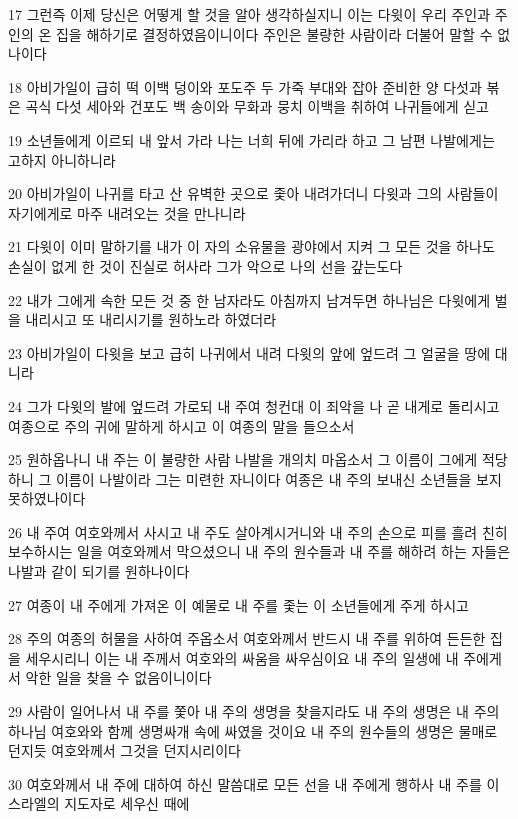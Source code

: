 \par 17 그런즉 이제 당신은 어떻게 할 것을 알아 생각하실지니 이는 다윗이 우리 주인과 주인의 온 집을 해하기로 결정하였음이니이다 주인은 불량한 사람이라 더불어 말할 수 없나이다
\par 18 아비가일이 급히 떡 이백 덩이와 포도주 두 가죽 부대와 잡아 준비한 양 다섯과 볶은 곡식 다섯 세아와 건포도 백 송이와 무화과 뭉치 이백을 취하여 나귀들에게 싣고
\par 19 소년들에게 이르되 내 앞서 가라 나는 너희 뒤에 가리라 하고 그 남편 나발에게는 고하지 아니하니라
\par 20 아비가일이 나귀를 타고 산 유벽한 곳으로 좇아 내려가더니 다윗과 그의 사람들이 자기에게로 마주 내려오는 것을 만나니라
\par 21 다윗이 이미 말하기를 내가 이 자의 소유물을 광야에서 지켜 그 모든 것을 하나도 손실이 없게 한 것이 진실로 허사라 그가 악으로 나의 선을 갚는도다
\par 22 내가 그에게 속한 모든 것 중 한 남자라도 아침까지 남겨두면 하나님은 다윗에게 벌을 내리시고 또 내리시기를 원하노라 하였더라
\par 23 아비가일이 다윗을 보고 급히 나귀에서 내려 다윗의 앞에 엎드려 그 얼굴을 땅에 대니라
\par 24 그가 다윗의 발에 엎드려 가로되 내 주여 청컨대 이 죄악을 나 곧 내게로 돌리시고 여종으로 주의 귀에 말하게 하시고 이 여종의 말을 들으소서
\par 25 원하옵나니 내 주는 이 불량한 사람 나발을 개의치 마옵소서 그 이름이 그에게 적당하니 그 이름이 나발이라 그는 미련한 자니이다 여종은 내 주의 보내신 소년들을 보지 못하였나이다
\par 26 내 주여 여호와께서 사시고 내 주도 살아계시거니와 내 주의 손으로 피를 흘려 친히 보수하시는 일을 여호와께서 막으셨으니 내 주의 원수들과 내 주를 해하려 하는 자들은 나발과 같이 되기를 원하나이다
\par 27 여종이 내 주에게 가져온 이 예물로 내 주를 좇는 이 소년들에게 주게 하시고
\par 28 주의 여종의 허물을 사하여 주옵소서 여호와께서 반드시 내 주를 위하여 든든한 집을 세우시리니 이는 내 주께서 여호와의 싸움을 싸우심이요 내 주의 일생에 내 주에게서 악한 일을 찾을 수 없음이니이다
\par 29 사람이 일어나서 내 주를 쫓아 내 주의 생명을 찾을지라도 내 주의 생명은 내 주의 하나님 여호와와 함께 생명싸개 속에 싸였을 것이요 내 주의 원수들의 생명은 물매로 던지듯 여호와께서 그것을 던지시리이다
\par 30 여호와께서 내 주에 대하여 하신 말씀대로 모든 선을 내 주에게 행하사 내 주를 이스라엘의 지도자로 세우신 때에
